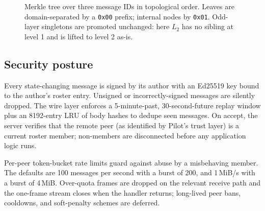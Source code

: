 \documentclass[11pt,a4paper,twocolumn]{article}
\begin{document}
\begin{figure}[t]
\centering
{}
\caption{Merkle tree over three message IDs in topological order. Leaves
are domain-separated by a \texttt{0x00} prefix; internal nodes by
\texttt{0x01}. Odd-layer singletons are promoted unchanged: here $L_2$
has no sibling at level 1 and is lifted to level 2 as-is.}
\label{fig:merkle}
\end{figure}

\subsection{Security posture}
\label{sec:security}

Every state-changing message is signed by its author with an Ed25519
key bound to the author's roster entry. Unsigned or incorrectly-signed
messages are silently dropped. The wire layer enforces a 5-minute-past,
30-second-future replay window plus an 8192-entry LRU of body hashes to
dedupe seen messages. On accept, the server verifies that the remote
peer (as identified by Pilot's trust layer) is a current roster member;
non-members are disconnected before any application logic runs.

Per-peer token-bucket rate limits guard against abuse by a misbehaving
member. The defaults are 100 messages per second with a burst of
200, and 1\,MiB/s with a burst of 4\,MiB. Over-quota frames are dropped
on the relevant receive path and the one-frame stream closes when the
handler returns; long-lived peer bans, cooldowns, and soft-penalty schemes
are deferred.
\end{document}

